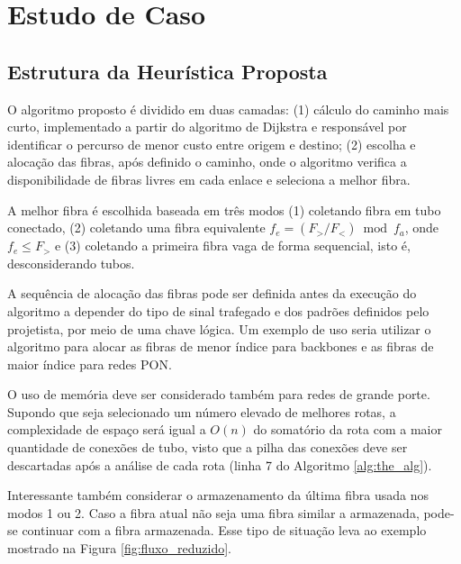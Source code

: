 \section{Estudo de Caso} \label{sec:algorithm}

%
\subsection{Estrutura da Heurística Proposta}

O algoritmo proposto é dividido em duas camadas: (1) cálculo do caminho mais
curto, implementado a partir do algoritmo de Dijkstra e responsável por
identificar o percurso de menor custo entre origem e destino; (2) escolha e
alocação das fibras, após definido o caminho, onde o algoritmo verifica a
disponibilidade de fibras livres em cada enlace e seleciona a melhor fibra.

A melhor fibra é escolhida baseada em três modos (1) coletando fibra em tubo
conectado, (2) coletando uma fibra equivalente $f_e = (F_{>} / {F_{<}}) \bmod
  f_{a}$, onde $f_{e} \leq F_{>}$ e (3) coletando a primeira
  fibra vaga de forma sequencial, isto é, desconsiderando tubos.

A sequência de alocação das fibras pode ser definida antes da execução do
algoritmo a depender do tipo de sinal trafegado e dos padrões definidos pelo
projetista, por meio de uma chave lógica. Um exemplo de uso seria utilizar o
algoritmo para alocar as fibras de menor índice para backbones e as fibras de
maior índice para redes PON.

O uso de memória deve ser considerado também para redes de grande porte.
Supondo que seja selecionado um número elevado de melhores rotas, a
complexidade de espaço será igual a $O(n)$ do somatório da rota com a maior
quantidade de conexões de tubo, visto que a pilha das conexões deve ser
descartadas após a análise de cada rota (linha 7 do Algoritmo
\ref{alg:the_alg}).

Interessante também considerar o armazenamento da última fibra usada nos modos
1 ou 2. Caso a fibra atual não seja uma fibra similar a armazenada, pode-se
continuar com a fibra armazenada. Esse tipo de situação leva ao exemplo
mostrado na Figura \ref{fig:fluxo_reduzido}.

